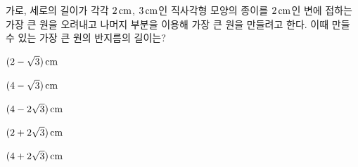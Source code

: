 가로, 세로의 길이가 각각 $2\mkern3mu \mathrm{cm}$, $3\mkern3mu \mathrm{cm}$인 직사각형 모양의 종이를 $2\mkern3mu \mathrm{cm}$인 변에 접하는 가장 큰 원을 오려내고 나머지 부분을 이용해 가장 큰 원을 만들려고 한다. 이때 만들 수 있는 가장 큰 원의 반지름의 길이는?
\begin{choicesii}{\rule[-3ex]{0pt}{8ex}$(2-\sqrt{3})\mkern3mu \mathrm{cm}$}{\rule[-3ex]{0pt}{8ex}$(4-\sqrt{3})\mkern3mu \mathrm{cm}$}{\rule[-3ex]{0pt}{8ex}$(4-2\sqrt{3})\mkern3mu \mathrm{cm}$}{\rule[-3ex]{0pt}{8ex}$(2+2\sqrt{3})\mkern3mu \mathrm{cm}$}{\rule[-3ex]{0pt}{8ex}$(4+2\sqrt{3})\mkern3mu \mathrm{cm}$}\end{choicesii}
